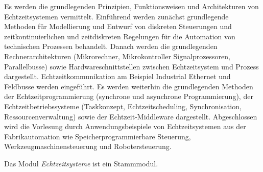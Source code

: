 \begin{module}
\begin{content}
Es werden die grundlegenden Prinzipien, Funktionsweisen und Architekturen von Echtzeitsystemen vermittelt. Einführend werden zunächst grundlegende Methoden für Modellierung und Entwurf von diskreten Steuerungen und zeitkontinuierlichen und zeitdiskreten Regelungen für die Automation von technischen Prozessen behandelt. Danach werden die grundlegenden Rechnerarchitekturen (Mikrorechner, Mikrokontroller Signalprozessoren, Parallelbusse) sowie Hardwareschnittstellen zwischen Echtzeitsystem und Prozess dargestellt. Echtzeitkommunikation am Beispiel Industrial Ethernet und Feldbusse werden eingeführt. Es werden weiterhin die grundlegenden Methoden der Echtzeitprogrammierung (synchrone und asynchrone Programmierung), der Echtzeitbetriebssysteme (Taskkonzept, Echtzeitscheduling, Synchronisation, Ressourcenverwaltung) sowie der Echtzeit-Middleware dargestellt. Abgeschlossen wird die Vorlesung durch Anwendungsbeispiele von Echtzeitsystemen aus der Fabrikautomation wie Speicherprogrammierbare Steuerung, Werkzeugmaschinensteuerung und Robotersteuerung.


\end{content}

\begin{remarks}Das Modul \emph{Echtzeitsysteme} ist ein Stammmodul.

\end{remarks}

\end{module}


